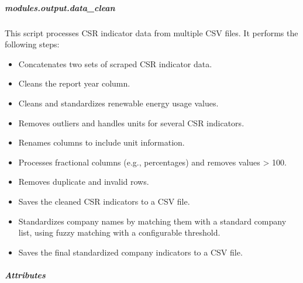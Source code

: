 \documentclass[letterpaper,10pt,english]{sphinxmanual}
\begin{document}
\subparagraph{modules.output.data\_clean}
\label{\detokenize{autoapi/modules/output/data_clean/index:module-modules.output.data_clean}}\label{\detokenize{autoapi/modules/output/data_clean/index:modules-output-data-clean}}\label{\detokenize{autoapi/modules/output/data_clean/index::doc}}
\sphinxAtStartPar
This script processes CSR indicator data from multiple CSV files.
It performs the following steps:
\begin{itemize}
\item {} 
\sphinxAtStartPar
Concatenates two sets of scraped CSR indicator data.

\item {} 
\sphinxAtStartPar
Cleans the report year column.

\item {} 
\sphinxAtStartPar
Cleans and standardizes renewable energy usage values.

\item {} 
\sphinxAtStartPar
Removes outliers and handles units for several CSR indicators.

\item {} 
\sphinxAtStartPar
Renames columns to include unit information.

\item {} 
\sphinxAtStartPar
Processes fractional columns (e.g., percentages) and removes values \textgreater{} 100.

\item {} 
\sphinxAtStartPar
Removes duplicate and invalid rows.

\item {} 
\sphinxAtStartPar
Saves the cleaned CSR indicators to a CSV file.

\item {} 
\sphinxAtStartPar
Standardizes company names by matching them with a standard company list,
using fuzzy matching with a configurable threshold.

\item {} 
\sphinxAtStartPar
Saves the final standardized company indicators to a CSV file.

\end{itemize}


\subparagraph{Attributes}
\label{\detokenize{autoapi/modules/output/data_clean/index:attributes}}
\end{document}
